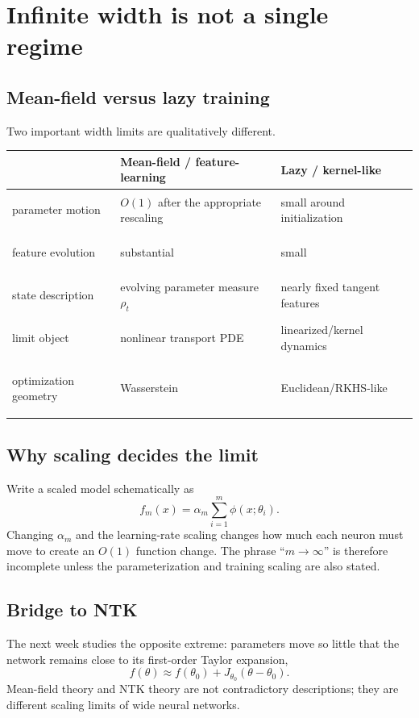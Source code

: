 \documentclass[11pt,a4paper,oneside,openany]{memoir}
\theoremstyle{definition}
\begin{document}
\chapter{Infinite width is not a single regime}
\section{Mean-field versus lazy training}
Two important width limits are qualitatively different.

\begin{center}\small
\begin{tabularx}{\textwidth}{>{\bfseries\raggedright\arraybackslash}p{}XX}
\toprule
 & Mean-field / feature-learning & Lazy / kernel-like\\
\midrule
parameter motion & $O(1)$ after the appropriate rescaling & small around initialization\\
feature evolution & substantial & small\\
state description & evolving parameter measure $\rho_t$ & nearly fixed tangent features\\
limit object & nonlinear transport PDE & linearized/kernel dynamics\\
optimization geometry & Wasserstein & Euclidean/RKHS-like\\
\bottomrule
\end{tabularx}
\end{center}

\section{Why scaling decides the limit}
Write a scaled model schematically as
\[
f_m(x)=\alpha_m\sum_{i=1}^m\phi(x;\theta_i).
\]
Changing $\alpha_m$ and the learning-rate scaling changes how much each neuron must move to create an $O(1)$ function change.  The phrase ``$m\to\infty$'' is therefore incomplete unless the parameterization and training scaling are also stated.

\section{Bridge to NTK}
The next week studies the opposite extreme: parameters move so little that the network remains close to its first-order Taylor expansion,
\[
f(\theta)\approx f(\theta_0)+J_{\theta_0}(\theta-\theta_0).
\]
Mean-field theory and NTK theory are not contradictory descriptions; they are different scaling limits of wide neural networks.
\end{document}
